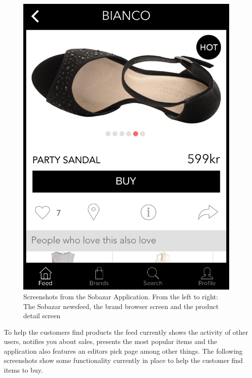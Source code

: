 \begin{figure}[H]
\begin{minipage}{.30\linewidth}
			\includegraphics[height=1.5\linewidth]{image/sobazarproduct.png}
		\end{minipage}
		\caption[Sobazar screenshots - version 0.5.1]{Screenshots from the Sobazar Application. From the left to right: The Sobazar newsfeed, the brand browser screen and the product detail screen}
		\label{figure:sobazarfeed}
	\end{figure}
	
	To help the customers find products the feed currently shows the activity of other users, notifies you about sales,
	presents the most popular items and the application also features an editors pick page among other things.
	The following screenshots show some functionality currently in place to help the customer find items to buy.
	
